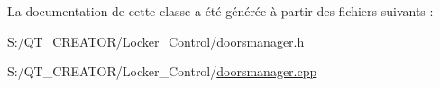 La documentation de cette classe a été générée à partir des fichiers suivants \+:\begin{DoxyCompactItemize}
\item 
S\+:/\+Q\+T\+\_\+\+C\+R\+E\+A\+T\+O\+R/\+Locker\+\_\+\+Control/\hyperlink{doorsmanager_8h}{doorsmanager.\+h}\item 
S\+:/\+Q\+T\+\_\+\+C\+R\+E\+A\+T\+O\+R/\+Locker\+\_\+\+Control/\hyperlink{doorsmanager_8cpp}{doorsmanager.\+cpp}\end{DoxyCompactItemize}
